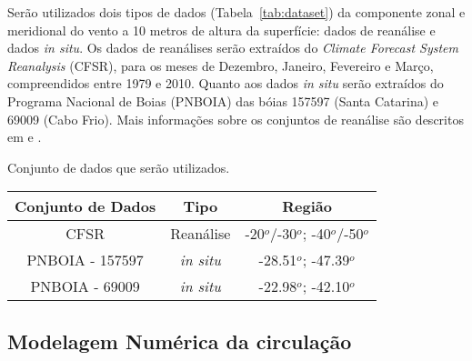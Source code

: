 \hspace{6mm} Serão utilizados dois tipos de dados (Tabela~\ref{tab:dataset}) da componente 
zonal e meridional do vento a 10 metros de altura da superfície: dados de reanálise e 
dados \textit{in situ}. Os dados de reanálises serão extraídos do \textit{Climate
Forecast System Reanalysis} (CFSR), para os meses de Dezembro, Janeiro, Fevereiro e
Março, compreendidos entre 1979 e 2010. Quanto aos dados \textit{in situ} 
serão extraídos do Programa Nacional de Boias (PNBOIA) das bóias 157597 (Santa Catarina) 
e 69009 (Cabo Frio). Mais informações sobre os conjuntos de reanálise são descritos em
 e .

\bigskip
\begin{center}
\begin{tablehere}
\caption{Conjunto de dados que serão utilizados.}
\label{tab:dataset}
\begin{tabular}{|c|c|c|}

\hline
\textbf{Conjunto de Dados}                   & \textbf{Tipo}    & \textbf{Região}      \\ \hline
CFSR    & Reanálise        & -20$^o$/-30$^o$; -40$^o$/-50$^o$ \\ \hline
PNBOIA - 157597 & \textit{in situ} & -28.51$^o$; -47.39$^o$     \\ \hline
PNBOIA - 69009  & \textit{in situ} & -22.98$^o$; -42.10$^o$     \\ \hline
\end{tabular}
\end{tablehere}
\bigskip
\end{center}


\subsection{Modelagem Numérica da circulação}
\label{sub:secom}

